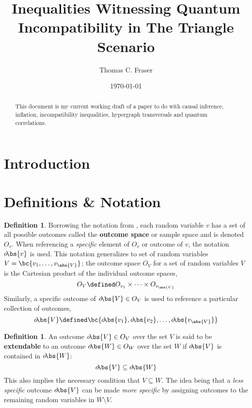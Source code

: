 \documentclass[aps, 10pt, english, twoside, pra, nofootinbib, longbibliography]{revtex4-1}
\theoremstyle{plain}
\theoremstyle{definition}
\newtheorem{definition}[theorem]{Definition}
\theoremstyle{remark}
\newcommand{\term}[1]{\textcolor{Mahogany}{\textbf{#1}}}
\newcommand{\outc}[1]{o\!\bs{#1}}
\begin{document}
    \title{Inequalities Witnessing Quantum Incompatibility in The Triangle Scenario}
    \author{Thomas C. Fraser}
    \date{\today}
    \begin{abstract}
        This document is my current working draft of a paper to do with causal inference, inflation, incompatibility inequalities, hypergraph transversals and quantum correlations.
    \end{abstract}
    \maketitle

    \section{Introduction}
    \section{Definitions \& Notation}

    \begin{definition}
        Borrowing the notation from \cite{Fritz_2014}, each random variable $v$ has a set of all possible outcomes called the \term{outcome space} or sample space and is denoted $O_v$. When referencing a \textit{specific} element of $O_v$ or outcome of $v$, the notation $\outc{v}$ is used. This notation generalizes to set of random variables $V = \bc{v_1, \ldots, v_{\abs{V}}}$; the outcome space $O_V$ for a set of random variables $V$ is the Cartesian product of the individual outcome spaces,
        \[ O_V \defined O_{v_1} \times \cdots \times O_{v_{\abs{V}}} \]
        Similarly, a specific outcome of $\outc{V} \in O_V$ is used to reference a particular collection of outcomes,
        \[ \outc{V} \defined \bc{\outc{v_1}, \outc{v_2}, \ldots, \outc{v_{\abs{V}}} } \]
    \end{definition}

    \begin{definition}
        \label{def:extendable}
        An outcome $\outc{V} \in O_V$ over the set $V$ is said to be \term{extendable} to an outcome $\outc{W} \in O_W$ over the set $W$ if $\outc{V}$ is contained in $\outc{W}$:
        \[ \outc{V} \subseteq \outc{W} \]
        This also implies the necessary condition that $V \subseteq W$. The idea being that a \textit{less specific} outcome $\outc{V}$ can be made \textit{more specific} by assigning outcomes to the remaining random variables in $W \setminus V$.
    \end{definition}
\end{document}
